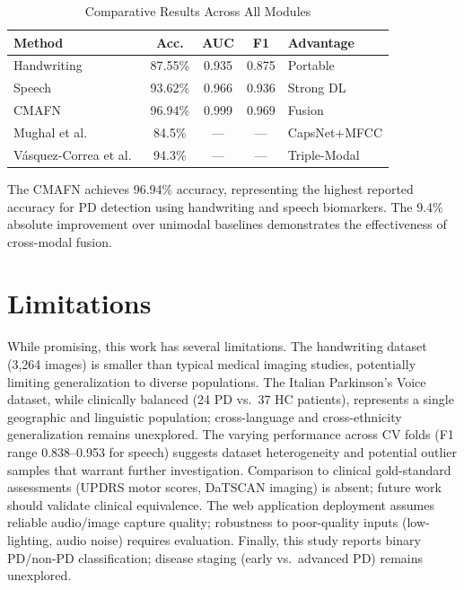 \documentclass[10pt,conference,letterpaper]{IEEEtran}
\begin{document}
\begin{table}[h]
\centering
\small
\setlength{\tabcolsep}{4pt}
\renewcommand{\arraystretch}{1.2}
\caption{Comparative Results Across All Modules}
\label{tab:results}
\begin{tabular}{@{}lcccp{1.8cm}@{}}
\toprule
\textbf{Method} & \textbf{Acc.} & \textbf{AUC} & \textbf{F1} & \textbf{Advantage} \\
\midrule
Handwriting                            & 87.55\% & 0.935 & 0.875 & Portable      \\
Speech                                 & 93.62\% & 0.966 & 0.936 & Strong DL     \\
CMAFN                                  & 96.94\% & 0.999 & 0.969 & Fusion        \\
Mughal et al.~\cite{ref16}             & 84.5\%  & ---   & ---   & CapsNet+MFCC  \\
V\'{a}squez-Correa et al.~\cite{ref20} & 94.3\%  & ---   & ---   & Triple-Modal  \\
\bottomrule
\end{tabular}
\end{table}

The CMAFN achieves 96.94\% accuracy, representing the highest reported accuracy for PD detection using handwriting and speech biomarkers. The 9.4\% absolute improvement over unimodal baselines demonstrates the effectiveness of cross-modal fusion.

\section{Limitations}

While promising, this work has several limitations. The handwriting dataset (3,264 images) is smaller than typical medical imaging studies, potentially limiting generalization to diverse populations. The Italian Parkinson's Voice dataset, while clinically balanced (24 PD vs.~37 HC patients), represents a single geographic and linguistic population; cross-language and cross-ethnicity generalization remains unexplored. The varying performance across CV folds (F1 range 0.838--0.953 for speech) suggests dataset heterogeneity and potential outlier samples that warrant further investigation. Comparison to clinical gold-standard assessments (UPDRS motor scores, DaTSCAN imaging) is absent; future work should validate clinical equivalence. The web application deployment assumes reliable audio/image capture quality; robustness to poor-quality inputs (low-lighting, audio noise) requires evaluation. Finally, this study reports binary PD/non-PD classification; disease staging (early vs.~advanced PD) remains unexplored.
\end{document}
